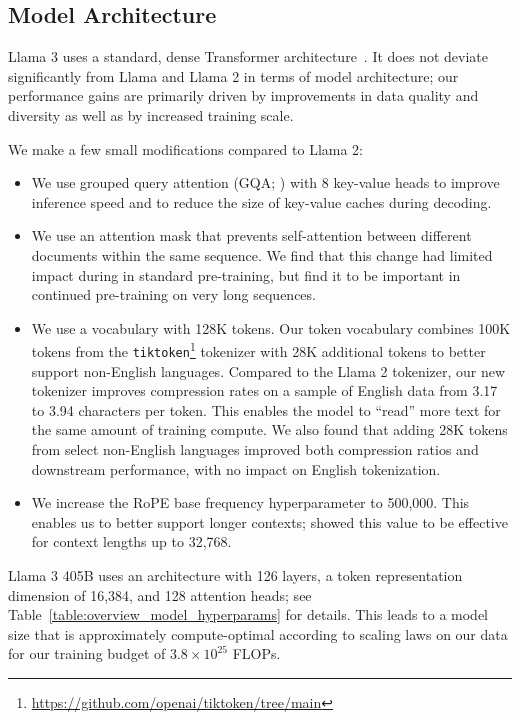 \subsection{Model Architecture}
\label{section:pretraining_model_architecture}

Llama 3 uses a standard, dense Transformer architecture~\citep{vaswani2017attention}. It does not deviate significantly from Llama and Llama 2 \citep{touvron2023llama,touvron2023llama2} in terms of model architecture; our performance gains are primarily driven by improvements in data quality and diversity as well as by increased training scale.

We make a few small modifications compared to Llama 2:

\begin{itemize}
    \item We use grouped query attention (GQA; \citet{ainslie2023gqa}) with 8 key-value heads to improve inference speed and to reduce the size of key-value caches during decoding.
    \item We use an attention mask that prevents self-attention between different documents within the same sequence. We find that this change had limited impact during in standard pre-training, but find it to be important in continued pre-training on very long sequences.
    \item We use a vocabulary with 128K tokens. Our token vocabulary combines 100K tokens from the \texttt{tiktoken}\footnote{\url{https://github.com/openai/tiktoken/tree/main}} tokenizer with 28K additional tokens to better support non-English languages. Compared to the Llama 2 tokenizer, our new tokenizer improves compression rates on a sample of English data from 3.17 to 3.94 characters per token. This enables the model to ``read'' more text for the same amount of training compute. We also found that adding 28K tokens from select non-English languages improved both compression ratios and downstream performance, with no impact on English tokenization.
    \item We increase the RoPE base frequency hyperparameter to 500,000. This enables us to better support longer contexts; \citet{xiong2023effective} showed this value to be effective for context lengths up to 32,768.
\end{itemize}

Llama 3 405B uses an architecture with 126 layers, a token representation dimension of 16,384, and 128 attention heads; see Table~\ref{table:overview_model_hyperparams} for details. This leads to a model size that is approximately compute-optimal according to scaling laws on our data for our training budget of $3.8 \times 10^{25}$ FLOPs.

